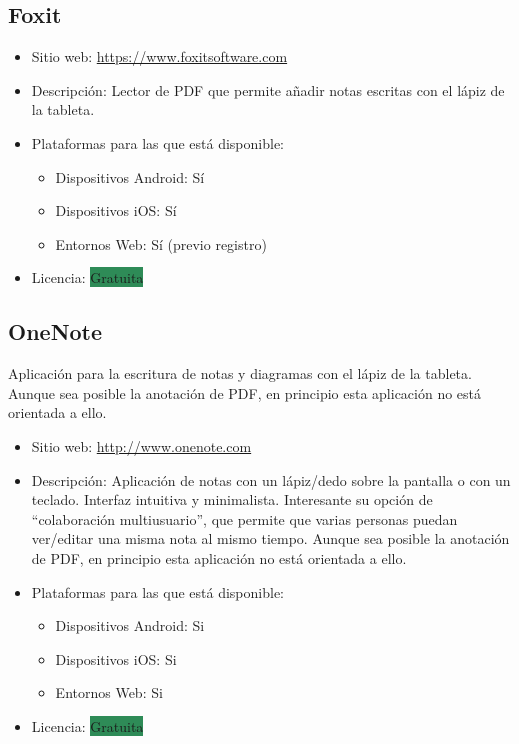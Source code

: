 \documentclass[11pt]{article}
\newcommand{\gratis}{\colorbox{SeaGreen}{Gratuita}}
\begin{document}
\subsection{Foxit}


\begin{itemize}
\item Sitio web: \url{https://www.foxitsoftware.com}
\item Descripción:
Lector de PDF que permite añadir notas escritas con
el lápiz de la tableta.
\item Plataformas para las que está disponible:
  \begin{itemize}
  \item Dispositivos Android: Sí
  \item Dispositivos iOS: Sí
  \item Entornos Web: Sí (previo registro)
  \end{itemize}
\item Licencia: \gratis
\end{itemize}

\subsection{OneNote}

Aplicación para la escritura de notas y diagramas con el lápiz de la tableta. Aunque sea posible la anotación de PDF, en principio esta aplicación no está orientada a ello.

\begin{itemize}
\item Sitio web: \url{http://www.onenote.com}
\item Descripción: Aplicación de notas con un lápiz/dedo sobre la pantalla o con un teclado. Interfaz intuitiva y minimalista. Interesante su opción de ``colaboración multiusuario'', que permite que varias personas puedan ver/editar una misma nota al mismo tiempo. Aunque sea posible la anotación de PDF, en principio esta aplicación no está orientada a ello.

\item Plataformas para las que está disponible:
  \begin{itemize}
  \item Dispositivos Android: Si
  \item Dispositivos iOS: Si
  \item Entornos Web: Si
  \end{itemize}
\item Licencia: \gratis
\end{itemize}
\end{document}
